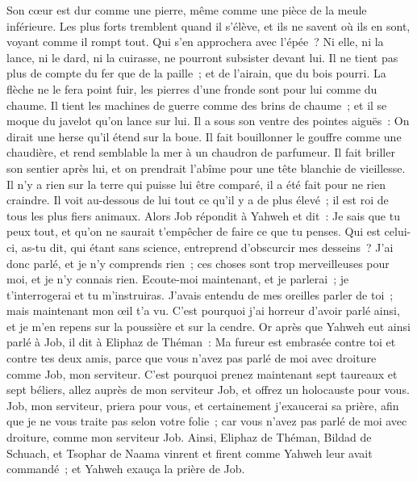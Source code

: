 \begin{multicols}{2}
Son cœur est dur comme une pierre, même comme une pièce de la meule inférieure.
Les plus forts tremblent quand il s'élève, et ils ne savent où ils en sont, voyant comme il rompt tout.
Qui s'en approchera avec l'épée~? Ni elle, ni la lance, ni le dard, ni la cuirasse, ne pourront subsister devant lui.
Il ne tient pas plus de compte du fer que de la paille~; et de l'airain, que du bois pourri.
La flèche ne le fera point fuir, les pierres d'une fronde sont pour lui comme du chaume.
Il tient les machines de guerre comme des brins de chaume~; et il se moque du javelot qu'on lance sur lui.
Il a sous son ventre des pointes aiguës~: On dirait une herse qu'il étend sur la boue.
Il fait bouillonner le gouffre comme une chaudière, et rend semblable la mer à un chaudron de parfumeur.
Il fait briller son sentier après lui, et on prendrait l'abîme pour une tête blanchie de vieillesse.
Il n'y a rien sur la terre qui puisse lui être comparé, il a été fait pour ne rien craindre.
Il voit au-dessous de lui tout ce qu'il y a de plus élevé~; il est roi de tous les plus fiers animaux.
\VerseOne{}Alors Job répondit à Yahweh et dit~:
Je sais que tu peux tout, et qu'on ne saurait t'empêcher de faire ce que tu penses.
Qui est celui-ci, as-tu dit, qui étant sans science, entreprend d'obscurcir mes desseins~? J'ai donc parlé, et je n'y comprends rien~; ces choses sont trop merveilleuses pour moi, et je n'y connais rien.
Ecoute-moi maintenant, et je parlerai~; je t'interrogerai et tu m'instruiras.
J'avais entendu de mes oreilles parler de toi~; mais maintenant mon œil t'a vu.
C'est pourquoi j'ai horreur d'avoir parlé ainsi, et je m'en repens sur la poussière et sur la cendre.
Or après que Yahweh eut ainsi parlé à Job, il dit à Eliphaz de Théman~: Ma fureur est embrasée contre toi et contre tes deux amis, parce que vous n'avez pas parlé de moi avec droiture comme Job, mon serviteur.
C'est pourquoi prenez maintenant sept taureaux et sept béliers, allez auprès de mon serviteur Job, et offrez un holocauste pour vous. Job, mon serviteur, priera pour vous, et certainement j'exaucerai sa prière, afin que je ne vous traite pas selon votre folie~; car vous n'avez pas parlé de moi avec droiture, comme mon serviteur Job.
 Ainsi, Eliphaz de Théman, Bildad de Schuach, et Tsophar de Naama vinrent et firent comme Yahweh leur avait commandé~; et Yahweh exauça la prière de Job.

\end{multicols}
